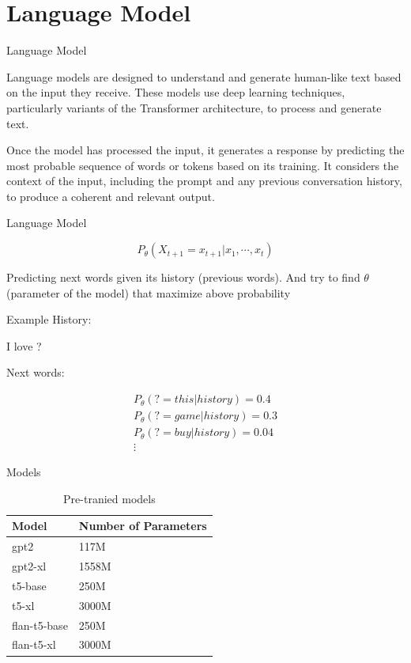 \documentclass{beamer}
\begin{document}
\section{Language  Model}

\begin{frame}{Language Model}

Language models are designed to understand and generate human-like text based on the input they receive. These models use deep learning techniques, particularly variants of the Transformer architecture, to process and generate text.

Once the model has processed the input, it generates a response by predicting the most probable sequence of words or tokens based on its training. It considers the context of the input, including the prompt and any previous conversation history, to produce a coherent and relevant output.
\end{frame}

\begin{frame}{Language Model}

$$P_\theta (X_{t+1} = x_{t+1} | x_1, \cdots, x_t)$$

Predicting next words given its history (previous words). And try to find $\theta$ (parameter of the model) that maximize above probability
\end{frame}



\begin{frame}{Example}
History:

I love ?

Next words:

\begin{align*}
    P_\theta(? = this | history) = 0.4\\
    P_\theta(? = game | history) = 0.3\\
    P_\theta(? = buy | history) = 0.04\\
    \vdots
\end{align*}

\end{frame}

\begin{frame}{Models}

\begin{table}[h]
\centering
\begin{tabular}{ll}
\toprule
\textbf{Model} & \textbf{Number of Parameters} \\
\midrule
gpt2 & 117M\\
gpt2-xl & 1558M\\
t5-base & 250M\\
t5-xl & 3000M\\
flan-t5-base & 250M\\
flan-t5-xl & 3000M \\
\bottomrule
\end{tabular}
\caption{Pre-tranied models}
\end{table}
    
\end{frame}
\end{document}
